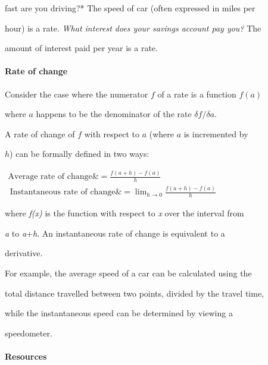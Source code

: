 fast are you driving?* The speed of car (often expressed in miles per

hour) is a rate. \textit{What interest does your savings account pay you?} The

amount of interest paid per year is a rate.



\paragraph{Rate of change}



Consider the case where the numerator $f$ of a rate is a function $f(a)$

where $a$ happens to be the denominator of the rate $\delta f/\delta a.$

A rate of change of $f$ with respect to $a$ (where $a$ is incremented by

$h$) can be formally defined in two ways:



$\begin{aligned}

    \mbox{Average rate of change} \&= \frac{f(a + h) - f(a)}{h} \\\    \mbox{Instantaneous rate of change} \&= \lim_{h \to 0}\frac{f(a + h) - f(a)}{h}

    \end{aligned}$



where \textit{f(x)} is the function with respect to \textit{x} over the interval from

\textit{a} to \textit{a}+\textit{h}. An instantaneous rate of change is equivalent to a

derivative.



For example, the average speed of a car can be calculated using the

total distance travelled between two points, divided by the travel time,

while the instantaneous speed can be determined by viewing a

speedometer.



\paragraph{Resources}



